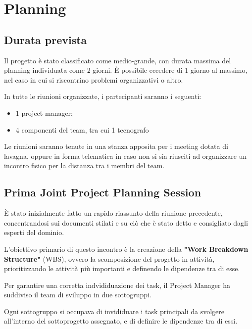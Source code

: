 \section{Planning}


\subsection{Durata prevista}
Il progetto è stato classificato come medio-grande, con durata massima del planning individuata come 2 giorni.
È possibile eccedere di 1 giorno al massimo, nel caso in cui si riscontrino problemi organizzativi o altro.

In tutte le riunioni organizzate, i partecipanti saranno i seguenti:
\begin{itemize}
    \item 1 project manager;
    \item 4 componenti del team, tra cui 1 tecnografo
\end{itemize}

Le riunioni saranno tenute in una stanza apposita per i meeting dotata di lavagna, oppure in forma
telematica in caso non si sia riusciti ad organizzare un incontro fisico per la distanza tra i membri del team.

\subsection{Prima Joint Project Planning Session}
È stato inizialmente fatto un rapido riassunto della riunione precedente, concentrandosi sui documenti stilati e su ciò che
è stato detto e consigliato dagli esperti del dominio.

L'obiettivo primario di questo incontro è la creazione della \textbf{"Work Breakdown Structure"} (WBS), ovvero la scomposizione
del progetto in attività, prioritizzando le attività più importanti e definendo le dipendenze tra di esse.

Per garantire una corretta indvididuazione dei task, il Project Manager ha suddiviso il team di sviluppo in due sottogruppi.

Ogni sottogruppo si occupava di invididuare i task principali da svolgere all'interno del sottoprogetto assegnato, e di
definire le dipendenze tra di essi.

